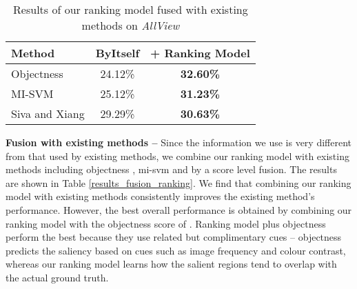 \documentclass{bmvc2k}
\begin{document}
\begin{table}[ht]
\begin{center}
\begin{tabular}{l| c| c}
\hline
\textbf{Method} & \textbf{ByItself} & + \textbf{Ranking Model}\\
\hline
Objectness \cite{Alexewhatisobject} & 24.12\% &  \textbf{32.60\%}\\
\hline
MI-SVM \cite{Andrews03supportvector} & 25.12\% &  \textbf{31.23\%}\\
\hline
Siva and Xiang \cite{Sivaiccv2011} & 29.29\% &  \textbf{30.63\%} \\
\hline
\end{tabular}
\label{results_fusion_ranking}
\end{center}

\caption{Results of our ranking model fused with existing methods on \emph{AllView}}
\label{results_fusion}
\end{table}
\noindent \textbf{Fusion with existing methods --}
Since the information we use is very different from that used by existing methods, we combine our ranking model with existing methods including objectness \citep{Alexewhatisobject}, {\sc mi-svm} \cite{Andrews03supportvector} and \cite{Sivaiccv2011} by a score level fusion. The results are shown in Table \ref{results_fusion_ranking}. We find that combining our ranking model with existing methods consistently improves the existing method's performance. However, the best overall performance is obtained by combining our ranking model with the objectness score of \citep{Alexewhatisobject}. Ranking model plus objectness perform the best because they use related but complimentary cues -- objectness predicts the saliency based on cues such as image frequency and colour contrast, whereas our ranking model learns how the salient regions tend to overlap with the actual ground truth. 
\end{document}
